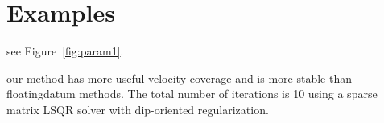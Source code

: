 \section{Examples}

 see Figure~\ref{fig:param1}. 






our method has more
useful velocity coverage and is more stable than floatingdatum
methods. The total number of iterations is 10
using a sparse matrix LSQR solver with dip-oriented
regularization.

